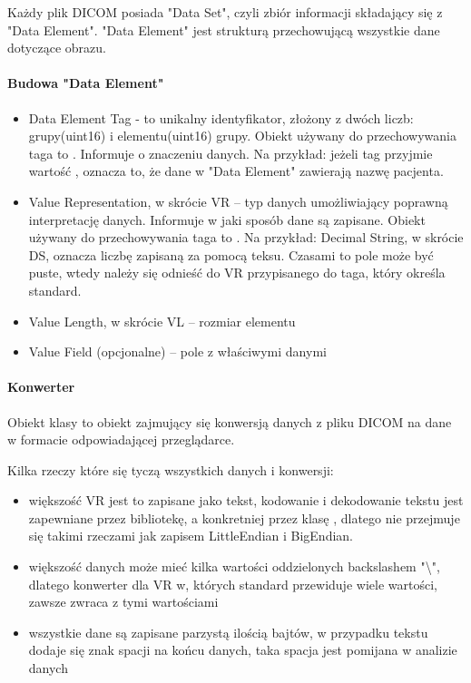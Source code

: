 
Każdy plik DICOM posiada "Data Set", czyli zbiór informacji składający się z "Data Element".
"Data Element" jest strukturą przechowującą wszystkie dane dotyczące obrazu.

\paragraph{Budowa "Data Element"}

\begin{itemize}
    \item Data Element Tag - to unikalny identyfikator, złożony z dwóch liczb: grupy(uint16) i elementu(uint16) grupy.
    Obiekt używany do przechowywania taga to .
    Informuje o znaczeniu danych.
    Na przykład: jeżeli tag przyjmie wartość , oznacza to, że dane w "Data Element" zawierają nazwę pacjenta.
    \item Value Representation, w skrócie VR – typ danych umożliwiający poprawną interpretację danych.
    Informuje w jaki sposób dane są zapisane.
    Obiekt używany do przechowywania taga to .
    Na przykład: Decimal String, w skrócie DS, oznacza liczbę zapisaną za pomocą teksu.
    Czasami to pole może być puste, wtedy należy się odnieść do VR przypisanego do taga, który określa standard.
    \item Value Length, w skrócie VL – rozmiar elementu
    \item Value Field (opcjonalne) – pole z właściwymi danymi
\end{itemize}

\paragraph{Konwerter}

Obiekt klasy  to obiekt zajmujący się konwersją danych z pliku DICOM na dane w formacie odpowiadającej przeglądarce.

Kilka rzeczy które się tyczą wszystkich danych i konwersji:
\begin{itemize}
    \item większość VR jest to zapisane jako tekst, kodowanie i dekodowanie tekstu jest zapewniane przez bibliotekę, a konkretniej przez klasę , dlatego nie przejmuje się takimi rzeczami jak zapisem LittleEndian i BigEndian.
    \item większość danych może mieć kilka wartości oddzielonych backslashem "\textbackslash", dlatego konwerter dla VR w, których standard przewiduje wiele wartości, zawsze zwraca  z tymi wartościami
    \item wszystkie dane są zapisane parzystą ilością bajtów, w przypadku tekstu dodaje się znak spacji na końcu danych, taka spacja jest pomijana w analizie danych
\end{itemize}

